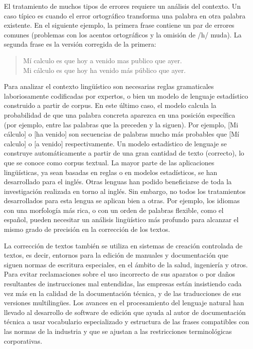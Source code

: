 \begin{multicols}{2}
El tratamiento de muchos tipos de errores requiere un análisis del contexto. Un caso típico es cuando el error ortográfico transforma una palabra en otra palabra existente. En el siguiente ejemplo, la primera frase contiene un par de errores comunes (problemas con los acentos ortográficos y la omisión de /h/ muda). La segunda frase es la versión corregida de la primera:

\begin{quote}
  Mí calculo es que hoy a venido mas publico que ayer.\\
  Mi cálculo es que hoy ha venido más público que ayer.
\end{quote}

Para analizar el contexto lingüístico son necesarias reglas gramaticales laboriosamente codificadas por expertos, o bien un modelo de lenguaje estadístico construido a partir de corpus. En este último caso, el modelo calcula la probabilidad de que una palabra concreta aparezca en una posición específica (por ejemplo, entre las palabras que la preceden y la siguen). Por ejemplo, [Mi cálculo] o [ha venido] son secuencias de palabras mucho más probables que [Mí calculo] o [a venido] respectivamente. Un modelo estadístico de lenguaje se construye automáticamente a partir de una gran cantidad de texto (correcto), lo que se conoce como corpus textual. La mayor parte de las aplicaciones lingüísticas, ya sean basadas en reglas o en modelos estadísticos, se han desarrollado para el inglés. Otras lenguas han podido beneficiarse de toda la investigación realizada en torno al inglés. Sin embargo, no todos los tratamientos desarrollados para esta lengua se aplican bien a otras. Por ejemplo, los idiomas con una morfología más rica, o con un orden de palabras flexible, como el español, pueden necesitar un análisis lingüístico más profundo para alcanzar el mismo grado de precisión en la corrección de los textos.

La corrección de textos también se utiliza en sistemas de creación controlada de textos, es decir, entornos para la edición de manuales y documentación que siguen normas de escritura especiales, en el ámbito de la salud, ingeniería y otros. Para evitar reclamaciones sobre el uso incorrecto de sus aparatos o por daños resultantes de instrucciones mal entendidas, las empresas están insistiendo cada vez más en la calidad de la documentación técnica, y de las traducciones de sus versiones multilingües. Los avances en el procesamiento del lenguaje natural han llevado al desarrollo de software de edición que ayuda al autor de documentación técnica a usar vocabulario especializado y estructura de las frases compatibles con las normas de la industria y que se ajustan a las restricciones terminológicas corporativas.


\end{multicols}
